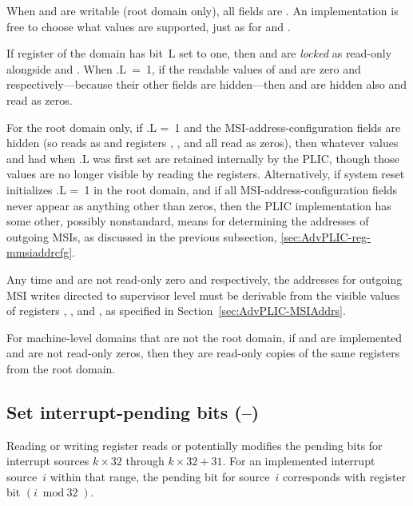 When  and  are writable
(root domain only), all fields are {\WARL}.
An implementation is free to choose what values are supported, just as
for  and .

If register  of the domain has bit~L set to one,
then  and  are \emph{locked}
as read-only alongside  and .
When .L~=~1, if the readable values of 
and  are zero and  respectively---because
their other fields are hidden---then  and
 are hidden also and read as zeros.

For the root domain only, if .L =~1 and the
MSI-address-configuration fields are hidden (so 
reads as  and registers ,
, and  all read as zeros),
then whatever values  and  had when
.L was first set are retained internally by the PLIC,
though those values are no longer visible by reading the registers.
Alternatively, if system reset initializes .L =~1 in
the root domain, and if all MSI-address-configuration fields never
appear as anything other than zeros, then the PLIC implementation
has some other, possibly nonstandard, means for determining
the addresses of outgoing MSIs, as discussed in the previous
subsection, \ref{sec:AdvPLIC-reg-mmsiaddrcfg}.

Any time  and  are not read-only
zero and  respectively, the addresses for outgoing
MSI writes directed to supervisor level must be derivable from the
visible values of registers , , and
, as specified in Section~\ref{sec:AdvPLIC-MSIAddrs}.

For machine-level domains that are not the root domain,
if  and  are implemented
and are not read-only zeros, then they are read-only
copies of the same registers from the root domain.

\subsection{%
Set interrupt-pending bits (--)%
}

Reading or writing register  reads or potentially
modifies the pending bits for interrupt sources $k\times\mbox{32}$
through ${k\times\mbox{32}+\mbox{31}}$.
For an implemented interrupt source~$i$ within that range, the pending
bit for source~$i$ corresponds with register bit ${(i\bmod\mbox{32})}$.

